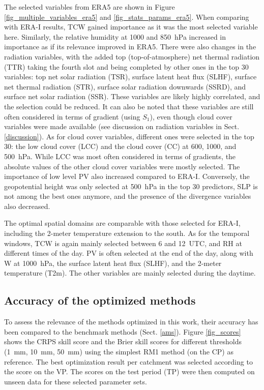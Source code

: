 \documentclass[draft]{agujournal2019}
\begin{document}
The selected variables from ERA5 are shown in Figure \ref{fig_multiple_variables_era5} and \ref{fig_stats_params_era5}. When comparing with ERA-I results, TCW gained importance as it was the most selected variable here. Similarly, the relative humidity at 1000 and 850~hPa increased in importance as if its relevance improved in ERA5. There were also changes in the radiation variables, with the added top (top-of-atmosphere) net thermal radiation (TTR) taking the fourth slot and being completed by other ones in the top 30 variables: top net solar radiation (TSR), surface latent heat flux (SLHF), surface net thermal radiation (STR), surface solar radiation downwards (SSRD), and surface net solar radiation (SSR). These variables are likely highly correlated, and the selection could be reduced. It can also be noted that these variables are still often considered in terms of gradient (using $S_{1}$), even though cloud cover variables were made available (see discussion on radiation variables in Sect. \ref{discussion}). As for cloud cover variables, different ones were selected in the top 30: the low cloud cover (LCC) and the cloud cover (CC) at 600, 1000, and 500~hPa. While LCC was most often considered in terms of gradients, the absolute values of the other cloud cover variables were mostly selected. The importance of low level PV also increased compared to ERA-I. Conversely, the geopotential height was only selected at 500~hPa in the top 30 predictors, SLP is not among the best ones anymore, and the presence of the divergence variables also decreased.

The optimal spatial domains are comparable with those selected for ERA-I, including the 2-meter temperature extension to the south. As for the temporal windows, TCW is again mainly selected between 6 and 12~UTC, and RH at different times of the day. PV is often selected at the end of the day, along with W at 1000~hPa, the surface latent heat flux (SLHF), and the 2-meter temperature (T2m). The other variables are mainly selected during the daytime.


\subsection{Accuracy of the optimized methods}
\label{skill_score}

To assess the relevance of the methods optimized in this work, their accuracy has been compared to the benchmark methods (Sect. \ref{ams}). Figure \ref{fig_scores} shows the CRPS skill score and the Brier skill scores for different thresholds (1~mm, 10~mm, 50~mm) using the simplest RM1 method (on the CP) as reference. The best optimization result per catchment was selected according to the score on the VP. The scores on the test period (TP) were then computed on unseen data for these selected parameter sets.
\end{document}
